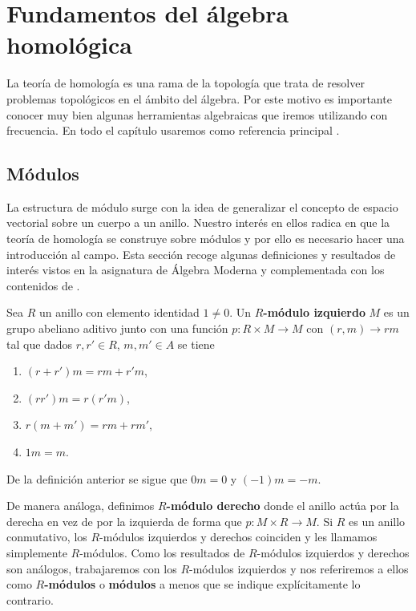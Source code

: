 
\chapter{Fundamentos del álgebra homológica}
La teoría de homología es una rama de la topología que trata de resolver
problemas topológicos en el ámbito del álgebra. Por este motivo es importante conocer
muy bien algunas herramientas algebraicas que iremos utilizando con frecuencia.
En todo el capítulo usaremos como referencia principal
\cite{maclane2012homology}.

\section{Módulos}

La estructura de módulo surge con la idea de generalizar el concepto de espacio vectorial
sobre un cuerpo a un anillo. Nuestro interés en ellos radica en que la teoría de
homología se construye sobre módulos y por ello es necesario hacer una
introducción al campo. Esta sección recoge algunas definiciones y resultados de interés
vistos en la asignatura de Álgebra Moderna y complementada con los contenidos de
\cite{dummit2004abstract}.

\begin{definicion}
	Sea \(R\) un anillo con elemento identidad \(1 \neq 0\). Un \textbf{\(R\)-módulo
		izquierdo} \(M\) es un grupo abeliano aditivo junto con una función \(p: R \times
	M \rightarrow M\) con \((r, m) \to rm\) tal que dados \(r,r' \in R\), \(m,m' \in A\)
	se tiene
	\begin{enumerate}
		\item \((r+r') m = r m + r' m\),
		
		\item \((rr') m = r (r' m)\),
		
		\item \(r(m+m') = rm + rm'\),
		
		\item \(1m = m\).
	\end{enumerate}
\end{definicion}

De la definición anterior se sigue que \(0m = 0\) y \((-1)m = -m\).

De manera análoga, definimos \textbf{\(R\)-módulo derecho} donde el anillo actúa
por la derecha en vez de por la izquierda de forma que
\(p: M \times R \rightarrow M\). Si \(R\) es un anillo conmutativo, los \(R\)-módulos
izquierdos y derechos coinciden y les llamamos simplemente \(R\)-módulos. Como los
resultados de \(R\)-módulos izquierdos y derechos son análogos, trabajaremos con
los \(R\)-módulos izquierdos y nos referiremos a ellos como \textbf{\(R\)-módulos} o
\textbf{módulos} a menos que se indique explícitamente lo contrario.

